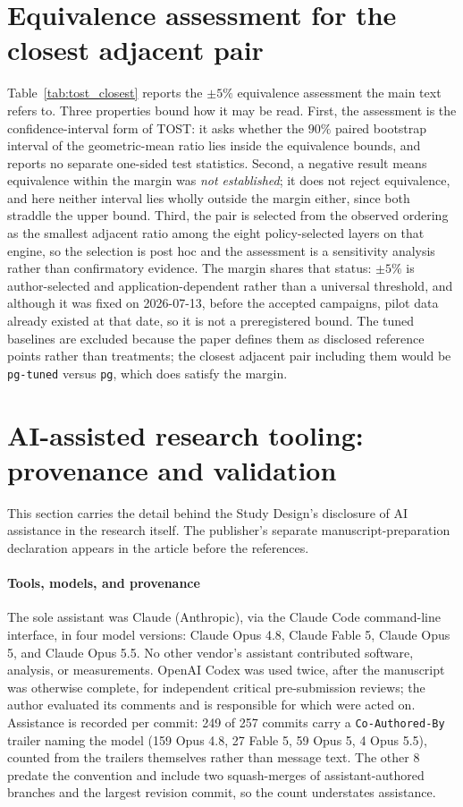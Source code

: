 \documentclass[11pt,a4paper]{article}
\newcommand{\tabledir}{tables/}
\begin{document}


\section{Equivalence assessment for the closest adjacent pair}
\label{sup:equivalence}
Table~\ref{tab:tost_closest} reports the $\pm5\%$ equivalence assessment the main text refers to.
Three properties bound how it may be read. First, the assessment is the confidence-interval form of
TOST: it asks whether the $90\%$ paired bootstrap interval of the geometric-mean ratio lies inside
the equivalence bounds, and reports no separate one-sided test statistics. Second, a negative result
means equivalence within the margin was \emph{not established}; it does not reject equivalence, and
here neither interval lies wholly outside the margin either, since both straddle the upper bound.
Third, the pair is selected from the observed ordering as the smallest adjacent ratio among the eight
policy-selected layers on that engine, so the selection is post hoc and the assessment is a sensitivity analysis
rather than confirmatory evidence. The margin shares that status: $\pm5\%$ is author-selected and
application-dependent rather than a universal threshold, and although it was fixed on 2026-07-13,
before the accepted campaigns, pilot data already existed at that date, so it is not a preregistered
bound. The tuned baselines are excluded because the paper defines them as disclosed reference points
rather than treatments; the closest adjacent pair including them would be
\texttt{pg-tuned} versus \texttt{pg}, which does satisfy the margin.



\section{AI-assisted research tooling: provenance and validation}
\label{sup:ai-tooling}
This section carries the detail behind the Study Design's disclosure of AI assistance in the
research itself. The publisher's separate manuscript-preparation declaration appears in the
article before the references.

\paragraph{Tools, models, and provenance} The sole assistant was Claude (Anthropic), via the
Claude Code command-line interface, in four model versions: Claude Opus 4.8, Claude Fable 5,
Claude Opus 5, and Claude Opus 5.5. No other vendor's assistant contributed software, analysis, or measurements. OpenAI
Codex was used twice, after the manuscript was otherwise complete, for independent critical
pre-submission reviews; the author evaluated its comments and is responsible for which were acted
on. Assistance is recorded per commit: 249 of 257 commits carry a \texttt{Co-Authored-By} trailer naming the model
(159 Opus 4.8, 27 Fable 5, 59 Opus 5, 4 Opus 5.5), counted from the trailers themselves rather
than message text. The other 8 predate the convention and include two squash-merges of
assistant-authored branches and the largest revision commit, so the count understates assistance.
\end{document}
